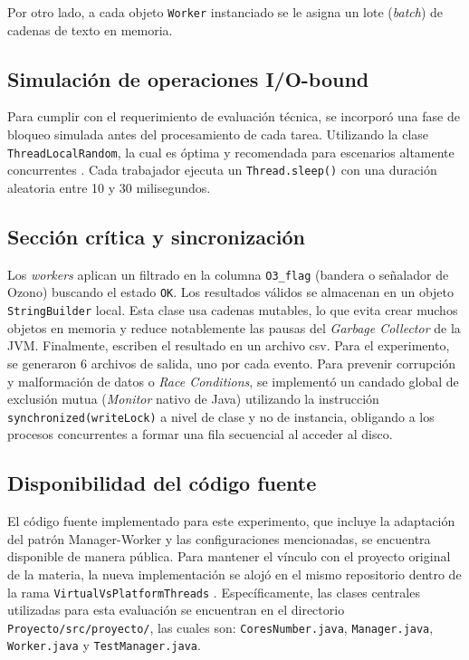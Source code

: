 \documentclass[12pt,a4paper]{article}
\begin{document}
Por otro lado, a cada objeto \texttt{Worker} instanciado se le asigna un lote (\textit{batch}) de cadenas de texto en memoria.

\subsection{Simulación de operaciones I/O-bound}
Para cumplir con el requerimiento de evaluación técnica, se incorporó una fase de bloqueo simulada antes del procesamiento de cada tarea. Utilizando la clase \texttt{ThreadLocalRandom}, la cual es óptima y recomendada para escenarios altamente concurrentes \cite{oracleThreadLocal}. Cada trabajador ejecuta un \texttt{Thread.sleep()} con una duración aleatoria entre 10 y 30 milisegundos.

\subsection{Sección crítica y sincronización}
Los \textit{workers} aplican un filtrado en la columna \texttt{O3\_flag} (bandera o señalador de Ozono) buscando el estado \texttt{OK}. Los resultados válidos se almacenan en un objeto \texttt{StringBuilder} local. Esta clase usa cadenas mutables, lo que evita crear muchos objetos en memoria y reduce notablemente las pausas del \textit{Garbage Collector} de la JVM. Finalmente, escriben el resultado en un archivo csv. Para el experimento, se generaron 6 archivos de salida, uno por cada evento. Para prevenir corrupción y malformación de datos o \textit{Race Conditions}, se implementó un candado global de exclusión mutua (\textit{Monitor} nativo de Java) utilizando la instrucción \texttt{synchronized(writeLock)} a nivel de clase y no de instancia, obligando a los procesos concurrentes a formar una fila secuencial al acceder al disco.

\subsection{Disponibilidad del código fuente}
El código fuente implementado para este experimento, que incluye la adaptación del patrón Manager-Worker y las configuraciones mencionadas, se encuentra disponible de manera pública. Para mantener el vínculo con el proyecto original de la materia, la nueva implementación se alojó en el mismo repositorio dentro de la rama \texttt{VirtualVsPlatformThreads} \cite{repoBranch2026}. Específicamente, las clases centrales utilizadas para esta evaluación se encuentran en el directorio \texttt{Proyecto/src/proyecto/}, las cuales son: \texttt{CoresNumber.java}, \texttt{Manager.java}, \texttt{Worker.java} y \texttt{TestManager.java}.
\end{document}
